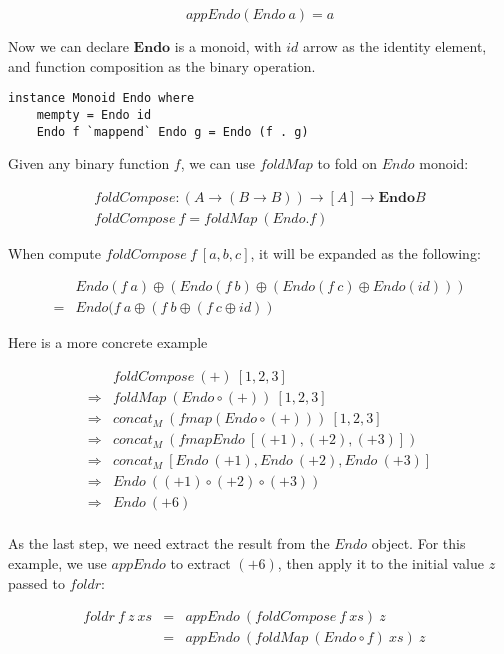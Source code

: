 \documentclass{article}
\begin{document}
\[
appEndo(Endo\ a) = a
\]

Now we can declare $\mathbf{Endo}$ is a monoid, with $id$ arrow as the identity element, and function composition as the binary operation.

\lstset{frame=single}
\begin{lstlisting}[style=Haskell]
instance Monoid Endo where
    mempty = Endo id
    Endo f `mappend` Endo g = Endo (f . g)
\end{lstlisting}

Given any binary function $f$, we can use $foldMap$ to fold on $Endo$ monoid:

\[
\begin{array}{l}
foldCompose : (A \to (B \to B)) \to [A] \to \mathbf{Endo}B \\
foldCompose\ f = foldMap\ (Endo . f)
\end{array}
\]

When compute $foldCompose\ f\ [a, b, c]$, it will be expanded as the following:

\[
\begin{array}{cl}
  & Endo(f\ a) \oplus (Endo(f\ b) \oplus (Endo(f\ c) \oplus Endo(id))) \\
= & Endo(f\ a \oplus (f\ b \oplus (f\ c \oplus id))
\end{array}
\]

Here is a more concrete example

\[
\begin{array}{cl}
            & foldCompose\ (+)\ [1, 2, 3] \\
\Rightarrow & foldMap\ (Endo \circ (+))\ [1, 2, 3] \\
\Rightarrow & concat_M\ (fmap (Endo \circ (+)))\ [1, 2, 3] \\
\Rightarrow & concat_M\ (fmap Endo\ [(+1), (+2), (+3)]) \\
\Rightarrow & concat_M\ [Endo\ (+1), Endo\ (+2), Endo\ (+3)] \\
\Rightarrow & Endo\ ((+1) \circ (+2) \circ (+3)) \\
\Rightarrow & Endo\ (+6) \\
\end{array}
\]

As the last step, we need extract the result from the $Endo$ object. For this example, we use $appEndo$ to extract $(+6)$, then apply it to the initial value $z$ passed to $foldr$:

\[
\begin{array}{rcll}
foldr\ f\ z\ xs
  & = & appEndo\ (foldCompose\ f\ xs)\ z & \\
  & = & appEndo\ (foldMap\ (Endo \circ f)\ xs)\ z \\
\end{array}
\]
\end{document}
